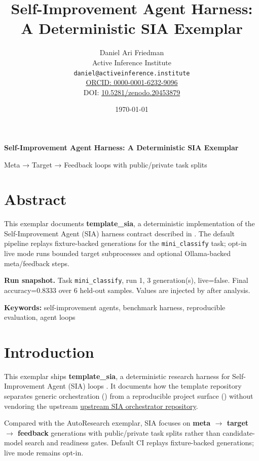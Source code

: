 \documentclass[
]{article}
\author{}
\date{}
\title{Self-Improvement Agent Harness: A Deterministic SIA Exemplar}
\author{Daniel Ari Friedman\\\footnotesize{Active Inference Institute}\\\footnotesize{\texttt{daniel@activeinference.institute}}\\\footnotesize{\href{https://orcid.org/0000-0001-6232-9096}{ORCID: 0000-0001-6232-9096}} \\ \footnotesize{DOI: \href{https://doi.org/10.5281/zenodo.20453879}{10.5281/zenodo.20453879}}}
\date{\today}
\begin{document}
\begin{titlepage}
\centering
\vspace*{2cm}
{\LARGE\bfseries Self-Improvement Agent Harness: A Deterministic SIA Exemplar\par}
\vspace{0.75em}
{\large Meta → Target → Feedback loops with public/private task splits\par}
\vfill
\makeatletter
{\@author\par}
\vspace{1em}
{\@date\par}
\makeatother
\vfill
\end{titlepage}
\thispagestyle{empty}
\tableofcontents
\newpage


\section{Abstract}\label{sec:abstract}

This exemplar documents \textbf{template\_sia}, a deterministic
implementation of the Self-Improvement Agent (SIA) harness contract
described in \citep{sia2026}. The default pipeline replays
fixture-backed generations for the \texttt{mini\_classify} task; opt-in
live mode runs bounded target subprocesses and optional Ollama-backed
meta/feedback steps.

\textbf{Run snapshot.} Task \texttt{mini\_classify}, run 1, 3
generation(s), live=false. Final accuracy=0.8333 over 6 held-out
samples. Values are injected by
 after analysis.

\textbf{Keywords:} self-improvement agents, benchmark harness,
reproducible evaluation, agent loops

\newpage

\section{Introduction}\label{sec:introduction}

This exemplar ships \textbf{template\_sia}, a deterministic research
harness for Self-Improvement Agent (SIA) loops \citep{sia2026}. It
documents how the template repository separates generic orchestration
() from a reproducible project surface
() without vendoring the
upstream \href{https://github.com/hexo-ai/sia}{upstream SIA orchestrator
repository}.

Compared with the AutoResearch exemplar, SIA focuses on \textbf{meta \texorpdfstring{\ensuremath{\to}}{->}
target \texorpdfstring{\ensuremath{\to}}{->} feedback} generations with public/private task splits rather
than candidate-model search and readiness gates. Default CI replays
fixture-backed generations; live mode remains opt-in.
\end{document}
